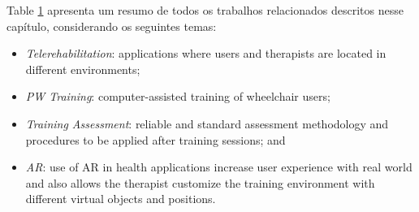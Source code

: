 \begin{table}[!hbt]
\begin{tabular}{ >{\centering}m{8cm} | >{\centering}m{1cm} | >{\centering}m{1cm} | >{\centering}m{1.1cm} | >{\centering}m{1cm} }
\tabularnewline\hline
\end{tabular}
\label{tab:relacionado1}
\end{table}


Table \ref{tab:relacionado1} apresenta um resumo de todos os trabalhos relacionados descritos nesse capítulo, considerando os seguintes temas:
\begin{itemize}
\item \textit{Telerehabilitation}: applications where users and therapists are located in different environments;
\item \textit{PW Training}: computer-assisted training of wheelchair users;
\item \textit{Training Assessment}: reliable and standard assessment methodology and procedures to be applied after training sessions; and
\item \textit{AR}: use of AR in health applications increase user experience with real world and also allows the therapist customize the training environment with different virtual objects and positions.
\end{itemize}



